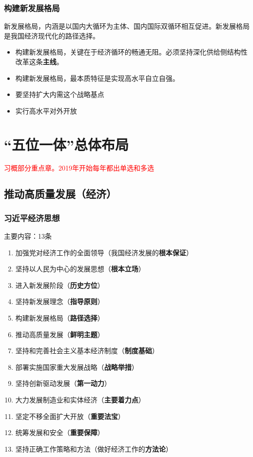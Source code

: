 \documentclass[12pt, a4paper, oneside]{ctexart}
\begin{document}
\subsubsection{构建新发展格局}

新发展格局，内涵是以国内大循环为主体、国内国际双循环相互促进。新发展格局是我国经济现代化的路径选择。

\begin{itemize}
  \item 构建新发展格局，关键在于经济循环的畅通无阻。必须坚持深化供给侧结构性改革这条\textbf{主线}。
  \item 构建新发展格局，最本质特征是实现高水平自立自强。
  \item 要坚持扩大内需这个战略基点
  \item 实行高水平对外开放
\end{itemize}

\section{“五位一体”总体布局}

\textcolor{red}{习概部分重点章。2019年开始每年都出单选和多选}

\subsection{推动高质量发展（经济）}

\subsubsection{习近平经济思想}

主要内容：13条

\begin{enumerate}
  \item 加强党对经济工作的全面领导（我国经济发展的\textbf{根本保证}）
  \item 坚持以人民为中心的发展思想（\textbf{根本立场}）
  \item 进入新发展阶段（\textbf{历史方位}）
  \item 坚持新发展理念（\textbf{指导原则}）
  \item 构建新发展格局（\textbf{路径选择}）
  \item 推动高质量发展（\textbf{鲜明主题}）
  \item 坚持和完善社会主义基本经济制度（\textbf{制度基础}）
  \item 部署实施国家重大发展战略（\textbf{战略举措}）
  \item 坚持创新驱动发展（\textbf{第一动力}）
  \item 大力发展制造业和实体经济（\textbf{主要着力点}）
  \item 坚定不移全面扩大开放（\textbf{重要法宝}）
  \item 统筹发展和安全（\textbf{重要保障}）
  \item 坚持正确工作策略和方法（做好经济工作的\textbf{方法论}）
\end{enumerate}
\end{document}
